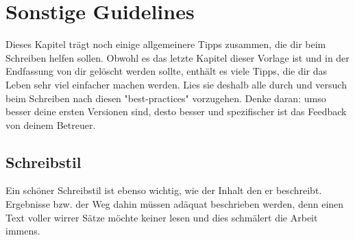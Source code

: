 
\chapter{Sonstige Guidelines}
Dieses Kapitel trägt noch einige allgemeinere Tipps zusammen, die dir beim Schreiben helfen sollen.
Obwohl es das letzte Kapitel dieser Vorlage ist und in der Endfassung von dir gelöscht werden sollte, enthält es viele Tipps, die dir das Leben sehr viel einfacher machen werden.
Lies sie deshalb alle durch und versuch beim Schreiben nach diesen "best-practices" vorzugehen.
Denke daran: umso besser deine ersten Versionen sind, desto besser und spezifischer ist das Feedback von deinem Betreuer.

\section{Schreibstil}
Ein schöner Schreibstil ist ebenso wichtig, wie der Inhalt den er beschreibt. 
Ergebnisse bzw. der Weg dahin müssen adäquat beschrieben werden, denn einen Text voller wirrer Sätze möchte keiner lesen und dies schmälert die Arbeit immens.

